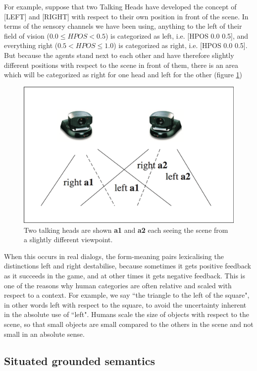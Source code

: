 For example, suppose that two Talking Heads have developed the 
concept of [LEFT] and [RIGHT] with respect to their own position 
in front of the scene. In terms of the sensory 
channels we have been using, anything to the left of their field  
of vision ($0.0 \le HPOS < 0.5$) is categorized as
left, i.e. [HPOS 0.0 0.5], and everything right  
($0.5 < HPOS \le 1.0$) is categorized as right, 
i.e. [HPOS 0.0 0.5]. But because the
agents stand next to each other and have therefore 
slightly different positions with respect to the 
scene in front of them, there is an area which will 
be categorized as right for one head and left for the other (figure \ref{left-right})
\begin{figure}[htbp]
  \centerline{\includegraphics[width=.65\textwidth]{chap2/figs/left-right}}
\caption{\small\label{left-right} Two talking heads are shown {\bf a1} and 
{\bf a2} each seeing the scene from a slightly different viewpoint.}
\end{figure}
When this occurs in real dialogs, the form-meaning 
pairs lexicalising the distinctions left and right destabilise,
because sometimes it gets positive feedback as 
it succeeds in the game, and at other times it 
gets negative feedback. 
This is one of the reasons why human categories are often 
relative and scaled with respect to a context.
For example, we say ``the triangle to the left of the square", in 
other words left with respect to the square, to avoid the uncertainty
inherent in the absolute use of ``left". Humans scale the size 
of objects with respect to the scene, so that small 
objects are small compared to the others in the scene 
and not small in an absolute sense. 

\subsection{Situated grounded semantics}

